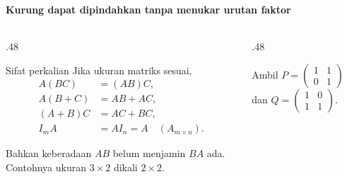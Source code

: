 \documentclass{../../kalkulus-ppt}
\begin{document}
\begin{frame}
    \frametitle{\insertsection}
    \framesubtitle{Kurung dapat dipindahkan tanpa menukar urutan faktor}
    \begin{columns}[c,onlytextwidth]
        \begin{column}{.48\textwidth}
            \begin{block}{Sifat perkalian}
                Jika ukuran matriks sesuai,
                \[
                    \begin{aligned}
                        A(BC)&=(AB)C,\\
                        A(B+C)&=AB+AC,\\
                        (A+B)C&=AC+BC,\\
                        I_m A&=A I_n=A\quad(A_{m\times n}).
                    \end{aligned}
                \]
            \end{block}
            Bahkan keberadaan $AB$ belum menjamin $BA$ ada. Contohnya ukuran $3\times2$ dikali $2\times2$.
        \end{column}
        \begin{column}{.48\textwidth}
            \begin{contoh}
                Ambil $P=\begin{pmatrix}1&1\\0&1\end{pmatrix}$ dan
                $Q=\begin{pmatrix}1&0\\1&1\end{pmatrix}$.
            \end{contoh}
        \end{column}
    \end{columns}
\end{frame}
\end{document}
